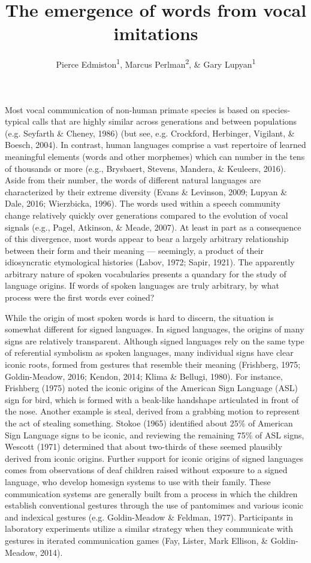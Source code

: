 \documentclass[english,floatsintext,man]{apa6}
\title{The emergence of words from vocal imitations}
\author{Pierce Edmiston\textsuperscript{1}, Marcus Perlman\textsuperscript{2}, \& Gary Lupyan\textsuperscript{1}}
\affiliation{
    \vspace{0.5cm}
          \textsuperscript{1} University of Wisconsin-Madison\\
          \textsuperscript{2} University of Birmingham  }
\theoremstyle{definition}
\theoremstyle{definition}
\theoremstyle{definition}
\theoremstyle{remark}
\begin{document}
\maketitle

\setcounter{secnumdepth}{0}



Most vocal communication of non-human primate species is based on
species-typical calls that are highly similar across generations and
between populations (e.g. Seyfarth \& Cheney, 1986) (but see, e.g.
Crockford, Herbinger, Vigilant, \& Boesch, 2004). In contrast, human
languages comprise a vast repertoire of learned meaningful elements
(words and other morphemes) which can number in the tens of thousands or
more (e.g., Brysbaert, Stevens, Mandera, \& Keuleers, 2016). Aside from
their number, the words of different natural languages are characterized
by their extreme diversity (Evans \& Levinson, 2009; Lupyan \& Dale,
2016; Wierzbicka, 1996). The words used within a speech community change
relatively quickly over generations compared to the evolution of vocal
signals (e.g., Pagel, Atkinson, \& Meade, 2007). At least in part as a
consequence of this divergence, most words appear to bear a largely
arbitrary relationship between their form and their meaning ---
seemingly, a product of their idiosyncratic etymological histories
(Labov, 1972; Sapir, 1921). The apparently arbitrary nature of spoken
vocabularies presents a quandary for the study of language origins. If
words of spoken languages are truly arbitrary, by what process were the
first words ever coined?

While the origin of most spoken words is hard to discern, the situation
is somewhat different for signed languages. In signed languages, the
origins of many signs are relatively transparent. Although signed
languages rely on the same type of referential symbolism as spoken
languages, many individual signs have clear iconic roots, formed from
gestures that resemble their meaning (Frishberg, 1975; Goldin-Meadow,
2016; Kendon, 2014; Klima \& Bellugi, 1980). For instance, Frishberg
(1975) noted the iconic origins of the American Sign Language (ASL) sign
for bird, which is formed with a beak-like handshape articulated in
front of the nose. Another example is steal, derived from a grabbing
motion to represent the act of stealing something. Stokoe (1965)
identified about 25\% of American Sign Language signs to be iconic, and
reviewing the remaining 75\% of ASL signs, Wescott (1971) determined
that about two-thirds of these seemed plausibly derived from iconic
origins. Further support for iconic origins of signed languages comes
from observations of deaf children raised without exposure to a signed
language, who develop homesign systems to use with their family. These
communication systems are generally built from a process in which the
children establish conventional gestures through the use of pantomimes
and various iconic and indexical gestures (e.g. Goldin-Meadow \&
Feldman, 1977). Participants in laboratory experiments utilize a similar
strategy when they communicate with gestures in iterated communication
games (Fay, Lister, Mark Ellison, \& Goldin-Meadow, 2014).
\end{document}
